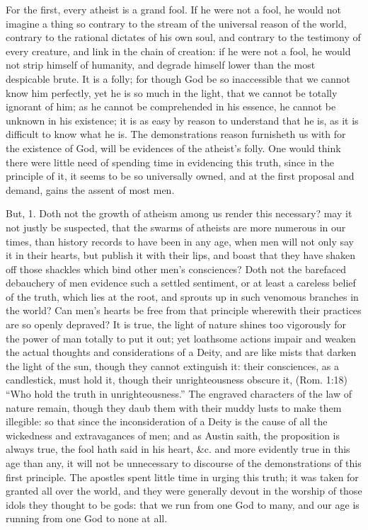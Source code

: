 \documentclass[a5paper]{book}
\begin{document}
For the first, every atheist is a grand fool. 
If he were not a fool, he would not imagine a thing so contrary 
    to the stream of the universal reason of the world, 
    contrary to the rational dictates of his own soul, 
    and contrary to the testimony of every creature, 
    and link in the chain of creation: 
    if he were not a fool, he would not strip himself of humanity, 
    and degrade himself lower than the most despicable brute. 
It is a folly; for though God be so inaccessible 
    that we cannot know him perfectly, 
    yet he is so much in the light, 
    that we cannot be totally ignorant of him; 
    as he cannot be comprehended in his essence, 
    he cannot be unknown in his existence; 
    it is as easy by reason to understand that he is, 
    as it is difficult to know what he is. 
The demonstrations reason furnisheth us with for the existence of God, 
    will be evidences of the atheist’s folly. 
One would think there were little need of spending time 
    in evidencing this truth, since in the principle of it, 
    it seems to be so universally owned, 
    and at the first proposal and demand, 
    gains the assent of most men.

But, 1. Doth not the growth of atheism among us render this necessary? 
    may it not justly be suspected, 
    that the swarms of atheists are more numerous in our times, 
    than history records to have been in any age, 
    when men will not only say it in their hearts, 
    but publish it with their lips, 
    and boast that they have shaken off those shackles 
    which bind other men’s consciences? 
Doth not the barefaced debauchery of men evidence such a settled sentiment, 
    or at least a careless belief of the truth, 
    which lies at the root, 
    and sprouts up in such venomous branches in the world? 
Can men’s hearts be free from that principle wherewith 
    their practices are so openly depraved? 
It is true, the light of nature shines too vigorously 
    for the power of man totally to put it out; 
    yet loathsome actions impair and weaken 
    the actual thoughts and considerations of a Deity, 
    and are like mists that darken the light of the sun, 
    though they cannot extinguish it: 
    their consciences, as a candlestick, must hold it, 
    though their unrighteousness obscure it, 
    (Rom. 1:18) ``Who hold the truth in unrighteousness.'' 
The engraved characters of the law of nature remain, 
    though they daub them with their muddy lusts to make them illegible: 
    so that since the inconsideration of a Deity 
    is the cause of all the wickedness and extravagances of men; 
    and as Austin saith,
    the proposition is always true, 
    the fool hath said in his heart, \&c.
    and more evidently true in this age than any, 
    it will not be unnecessary to discourse 
    of the demonstrations of this first principle. 
The apostles spent little time in urging this truth; 
    it was taken for granted all over the world, 
    and they were generally devout in the worship
    of those idols they thought to be gods: 
    that we run from one God to many, 
    and our age is running from one God to none at all.
\end{document}
